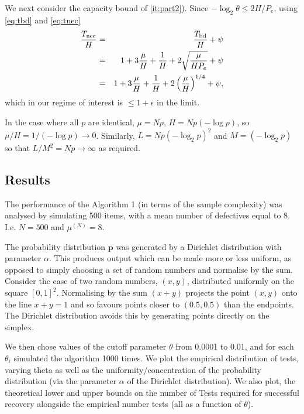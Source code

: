 \documentclass[conference]{IEEEtran}
\newcounter{eqn}
\newcommand{\vc}[1]{{\mathbf{ #1}}}
\newcommand{\nec}{{\rm nec}}
\newcommand{\bd}{{\rm bd}}
\begin{document}
\begin{IEEEproof}
We next consider the capacity bound of \ref{it:part2}).
Since $-\log_2 \theta \leq 2 H/P_e$, using \eqref{eq:tbd}  and \eqref{eq:tnec}
\begin{eqnarray}
\frac{T_{\nec}}{H} & = & 
 \frac{T_{\bd}}{H}  + \psi \nonumber\\
&  = & 1 + 3 \frac{\mu}{H} + \frac{1}{H}  + 2 \sqrt{ \frac{ \mu}{H P_e}} + \psi \nonumber \\
& =  & 1 + 3 \frac{\mu}{H} + \frac{1}{H} + 2 \left( \frac{\mu}{H} \right)^{1/4} + \psi, \label{eq:ratio2}
\end{eqnarray}
which in our regime of interest is $\leq 1 + \epsilon$ in the limit.
\end{IEEEproof}

\begin{IEEEproof}
In the case where all $p$ are identical, $\mu = N p$, $H  = N p (-\log p)$, so $\mu/H = 1/(-\log p) \rightarrow 0$. Similarly, $L = N p (-\log_2 p)^2$ and $M = ( -\log_2 p)$
so that $L/M^2 = N p \rightarrow \infty$ as required.
\end{IEEEproof}









\subsection{Results}
The performance of the Algorithm 1 (in terms of the sample complexity) was analysed by simulating 500 items, with a mean number of defectives equal to 8. I.e. \(N = 500\) and \(\mu^{(N)} = 8\). 

The probability distribution \(\vc{p}\) was generated by a Dirichlet distribution with parameter $\alpha$.
This produces  output which can be made more or less uniform, as opposed to
 simply choosing a set of random numbers and normalise by the sum. Consider the case of two random numbers, \(\left(x,y\right)\), distributed uniformly on the square \(\left[0,1\right]^2\). Normalising by the sum \(\left(x+y\right)\) projects the point \(\left(x,y\right)\) onto the line \(x+y=1\) and so favours points closer to \((0.5,0.5)\) than the endpoints. The Dirichlet distribution avoids this by generating points directly on the simplex.

We then chose values of the cutoff parameter \(\theta\) from 0.0001 to 0.01, and for each \(\theta_i\) simulated the algorithm 1000 times. We plot the empirical distribution of tests, varying theta as well as the uniformity/concentration of the probability distribution (via the parameter \(\alpha\) of the Dirichlet distribution). We also plot, the theoretical lower and upper bounds on the number of Tests required for successful recovery alongside the empirical number tests (all as a function of \(\theta\)).
\end{document}
